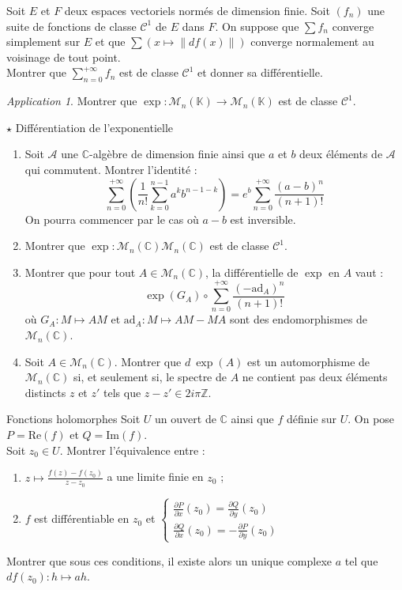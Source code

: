 \documentclass[french,a4paper]{article}
\newcommand{\Z}{\mathbb{Z}}
\newcommand{\C}{\mathbb{C}}
\newcommand{\K}{\mathbb{K}}
\theoremstyle{plain}
\theoremstyle{definition}
\theoremstyle{remark}
\newtheorem*{app}{Application}
\begin{document}
\begin{ex}{}
	Soit $E$ et $F$ deux espaces vectoriels normés de dimension finie. Soit $(f_n)$ une suite de fonctions de classe $\mathcal{C}^1$ de $E$ dans $F$. On suppose que $\sum f_n$ converge simplement sur $E$ et que $\displaystyle\sum(x\mapsto\lVert df(x)\rVert)$ converge normalement au voisinage de tout point. \\ Montrer que $\displaystyle\sum_{n=0}^{+\infty}f_n$ est de classe $\mathcal{C}^1$ et donner sa différentielle.
\end{ex}
\begin{app}
	Montrer que $\exp:\mathcal{M}_n(\K)\to\mathcal{M}_n(\K)$ est de classe $\mathcal{C}^1$.
\end{app}

\begin{ex}[Moulin.12]{$\star$ Différentiation de l'exponentielle}
	\begin{enumerate}
		\item Soit $\mathcal{A}$ une $\C$-algèbre de dimension finie ainsi que $a$ et $b$ deux éléments de $\mathcal{A}$ qui commutent. Montrer l'identité : $$\sum_{n=0}^{+\infty}\left(\frac{1}{n!}\sum_{k=0}^{n-1}a^kb^{n-1-k}\right)=e^b\sum_{n=0}^{+\infty}\frac{(a-b)^n}{(n+1)!}$$ On pourra commencer par le cas où $a-b$ est inversible.
		\item Montrer que $\exp:\mathcal{M}_n(\C)\mathcal{M}_n(\C)$ est de classe $\mathcal{C}^1$.
		\item Montrer que pour tout $A\in\mathcal{M}_n(\C)$, la différentielle de $\exp$ en $A$ vaut : $$\exp(G_A)\circ\sum_{n=0}^{+\infty}\frac{(-\text{ad}_A)^n}{(n+1)!}$$ où $G_A:M\mapsto AM$ et $\text{ad}_A:M\mapsto AM-MA$ sont des endomorphismes de $\mathcal{M}_n(\C)$.
		\item Soit $A\in\mathcal{M}_n(\C)$. Montrer que $d\ \exp(A)$ est un automorphisme de $\mathcal{M}_n(\C)$ si, et seulement si, le spectre de $A$ ne contient pas deux éléments distincts $z$ et $z'$ tels que $z-z'\in 2i\pi\Z$.
	\end{enumerate}
\end{ex}
\begin{ex}[Moulin.13]{Fonctions holomorphes}
	Soit $U$ un ouvert de $\C$ ainsi que $f$ définie sur $U$. On pose $P=\text{Re}(f)$ et $Q=\text{Im}(f)$.\\
	Soit $z_0\in U$. Montrer l'équivalence entre : 
	\begin{enumerate}[label=(\roman*)]
		\item $z\mapsto\displaystyle\frac{f(z)-f(z_0)}{z-z_0}$ a une limite finie en $z_0$ ;
		\item $f$ est différentiable en $z_0$ et $\displaystyle\begin{cases}
			\displaystyle\frac{\partial P}{\partial x}(z_0)=\frac{\partial Q}{\partial y}(z_0) \\
			\displaystyle\frac{\partial Q}{\partial x}(z_0)=-\frac{\partial P}{\partial y}(z_0)
		\end{cases}$
	\end{enumerate}
	Montrer que sous ces conditions, il existe alors un unique complexe $a$ tel que $df(z_0):h\mapsto ah$.
\end{ex}
\end{document}
